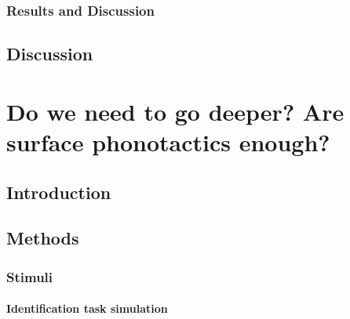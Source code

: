 {%



\subsubsection{Results and Discussion}
\subsection{Discussion}

\newpage
\section{{\color{red}Do we need to go deeper? Are surface phonotactics enough?}} \label{3-k-epenth}
\subsection{Introduction}
\subsection{Methods}
\subsubsection{Stimuli}
\paragraph{Identification task simulation}
}
